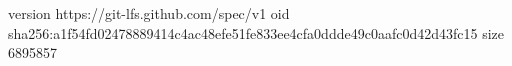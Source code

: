 version https://git-lfs.github.com/spec/v1
oid sha256:a1f54fd02478889414c4ac48efe51fe833ee4cfa0ddde49c0aafc0d42d43fc15
size 6895857
